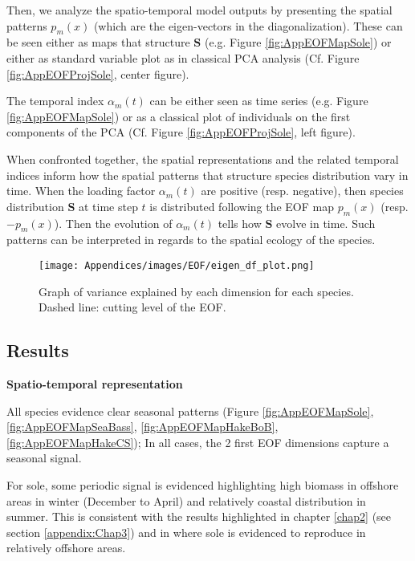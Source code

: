 Then, we analyze the spatio-temporal model outputs by presenting the spatial patterns $p_m(x)$ (which are the eigen-vectors in the diagonalization). These can be seen either as maps that structure $\mathbf{S}$ (e.g. Figure \ref{fig:AppEOFMapSole}) or either as standard variable plot as in classical PCA analysis (Cf. Figure  \ref{fig:AppEOFProjSole}, center figure).

The temporal index $\alpha_m(t)$ can be either seen as time series (e.g. Figure \ref{fig:AppEOFMapSole}) or as a classical plot of individuals on the first components of the PCA (Cf. Figure \ref{fig:AppEOFProjSole}, left figure).

When confronted together, the spatial representations and the related temporal indices inform how the spatial patterns that structure species distribution vary in time. When the loading factor $\alpha_m(t)$ are positive (resp. negative), then species distribution $\mathbf{S}$ at time step $t$ is distributed following the EOF map $p_m(x)$ (resp. $-p_m(x)$). Then the evolution of $\alpha_m(t)$ tells how $\mathbf{S}$ evolve in time. Such patterns can be interpreted in regards to the spatial ecology of the species.

\newpage

\begin{figure}[H]
   \begin{center}
      \texttt{[image: Appendices/images/EOF/eigen\_df\_plot.png]}
   \end{center}
   \caption[Graph of variance explained by each dimension for each species.]
   {Graph of variance explained by each dimension for each species. Dashed line: cutting level of the EOF.}
   \label{fig:VarCapt}
\end{figure}

\subsection{Results}

\textbf{Spatio-temporal representation}

All species evidence clear seasonal patterns (Figure \ref{fig:AppEOFMapSole}, \ref{fig:AppEOFMapSeaBass}, \ref{fig:AppEOFMapHakeBoB}, \ref{fig:AppEOFMapHakeCS}); In all cases, the 2 first EOF dimensions capture a seasonal signal.

For sole, some periodic signal is evidenced highlighting high biomass in offshore areas in winter (December to April) and relatively coastal distribution in summer. This is consistent with the results highlighted in chapter \ref{chap2} (see section \ref{appendix:Chap3}) and in \textcite{arbault-estimation-1986} where sole is evidenced to reproduce in relatively offshore areas.

